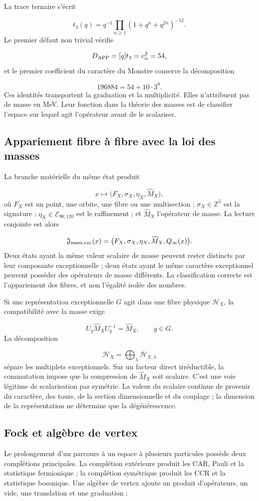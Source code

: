 La trace ternaire s’écrit

\[
t_3(q)=q^{-1}
\prod_{n\ge1}(1+q^n+q^{2n})^{-12}.
\]
Le premier défaut non trivial vérifie

\[
D_{\rm APP}=[q]t_3=v_\alpha^2=54,
\]
et le premier coefficient du caractère du Monstre conserve la décomposition

\[
196884=54+10\cdot3^9.
\]
Ces identités transportent la graduation et la multiplicité. Elles n’attribuent pas de masse en MeV. Leur fonction dans la théorie des masses est de classifier l’espace sur lequel agit l’opérateur avant de le scalariser.

\subsection{Appariement fibre à fibre avec la loi des masses}
La branche matérielle du même état produit

\[
x\longmapsto
\bigl(F_X,\sigma_X,\eta_X,\widehat M_X\bigr),
\]
où \(F_X\) est un point, une orbite, une fibre ou une multisection ; \(\sigma_X\in\mathbb Z^5\) est la signature ; \(\eta_X\in\mathcal E_{90,120}\) est le raffinement ; et \(\widehat M_X\) l’opérateur de masse. La lecture conjointe est alors

\[
\mathfrak J_{\rm mass,exc}(x)
=\bigl(F_X,\sigma_X,\eta_X,\widehat M_X,Q_\infty(x)\bigr).
\]
Deux états ayant la même valeur scalaire de masse peuvent rester distincts par leur composante exceptionnelle ; deux états ayant le même caractère exceptionnel peuvent posséder des opérateurs de masse différents. La classification correcte est l’appariement des fibres, et non l’égalité isolée des nombres.

Si une représentation exceptionnelle \(G\) agit dans une fibre physique \(\mathcal H_X\), la compatibilité avec la masse exige

\[
U_g\widehat M_XU_g^{-1}=\widehat M_X,
\qquad g\in G.
\]
La décomposition

\[
\mathcal H_X=\bigoplus_{\lambda}
\mathcal H_{X,\lambda}
\]
sépare les multiplets exceptionnels. Sur un facteur direct irréductible, la commutation impose que la compression de \(\widehat M_X\) soit scalaire. C’est une voie légitime de scalarisation par symétrie. La valeur du scalaire continue de provenir du caractère, des tours, de la section dimensionnelle et du couplage ; la dimension de la représentation ne détermine que la dégénérescence.

\subsection{Fock et algèbre de vertex}
Le prolongement d’un parcours à un espace à plusieurs particules possède deux complétions principales. La complétion extérieure produit les CAR, Pauli et la statistique fermionique ; la complétion symétrique produit les CCR et la statistique bosonique. Une algèbre de vertex ajoute un produit d’opérateurs, un vide, une translation et une graduation :

